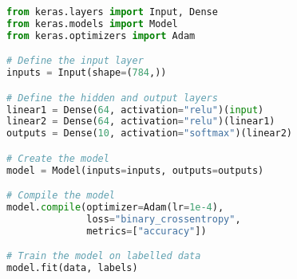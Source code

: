 \begin{lstlisting}[float={ht},caption={An small code snippet defining a simple model with an input of a 1D tensor of length 784, two hidden layers both containing 64 units with ReLU actiation functions, and an output layer containing 10 units using the softmax activation function. The model is then trained using the Keras implementation of the Adam optimiser to minimise the binary cross-entropy loss.},label={lst:keras},language=Python,upquote=true]
from keras.layers import Input, Dense
from keras.models import Model
from keras.optimizers import Adam

# Define the input layer
inputs = Input(shape=(784,))

# Define the hidden and output layers
linear1 = Dense(64, activation="relu")(input)
linear2 = Dense(64, activation="relu")(linear1)
outputs = Dense(10, activation="softmax")(linear2)

# Create the model
model = Model(inputs=inputs, outputs=outputs)

# Compile the model
model.compile(optimizer=Adam(lr=1e-4),
              loss="binary_crossentropy",
              metrics=["accuracy"])

# Train the model on labelled data
model.fit(data, labels)
\end{lstlisting}